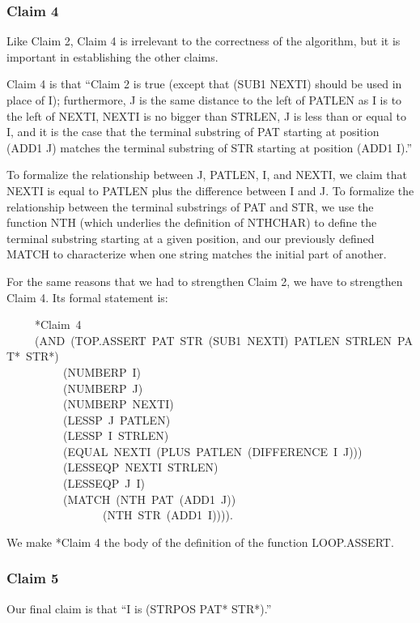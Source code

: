 \documentclass[10pt]{book}
\newenvironment{pubasis}{\begin{flushleft}}{\end{flushleft}}
\begin{document}
\subsubsection{Claim 4}
Like Claim 2, Claim 4 is irrelevant to the correctness of the algorithm,
but it is important in establishing the other claims.

Claim 4 is that ``Claim 2 is true (except that (SUB1 NEXTI) should be used in place of I); furthermore, J is the same distance to
the left of PATLEN as I is to the left of NEXTI, NEXTI is no bigger
than STRLEN, J is less than or equal to I, and it is the case that
the terminal substring of PAT starting at position (ADD1 J) matches
the terminal substring of STR starting at position (ADD1 I).''

To formalize the relationship between J, PATLEN, I, and NEXTI, we 
claim that NEXTI is equal to PATLEN plus the difference between
I and J.  To formalize the relationship between the terminal substrings
of PAT and STR, we  use the function NTH (which underlies the definition of NTHCHAR) to define the terminal
substring starting at a given position, and our previously defined MATCH
to characterize when one string matches the initial part of
another.

For the same reasons that we had to strengthen Claim 2, we have to
strengthen Claim 4.  Its formal statement is:
\begin{pubasis}
~~~~~*Claim~4\\
~~~~~(AND~(TOP.ASSERT~PAT~STR~(SUB1~NEXTI)~PATLEN~STRLEN~PAT*~STR*)\\
~~~~~~~~~~(NUMBERP~I)\\
~~~~~~~~~~(NUMBERP~J)\\
~~~~~~~~~~(NUMBERP~NEXTI)\\
~~~~~~~~~~(LESSP~J~PATLEN)\\
~~~~~~~~~~(LESSP~I~STRLEN)\\
~~~~~~~~~~(EQUAL~NEXTI~(PLUS~PATLEN~(DIFFERENCE~I~J)))\\
~~~~~~~~~~(LESSEQP~NEXTI~STRLEN)\\
~~~~~~~~~~(LESSEQP~J~I)\\
~~~~~~~~~~(MATCH~(NTH~PAT~(ADD1~J))\\
~~~~~~~~~~~~~~~~~(NTH~STR~(ADD1~I)))).\\
\end{pubasis}
We  make *Claim 4 the body of the definition of the function LOOP.ASSERT.

\subsubsection{Claim 5}
Our final claim is that ``I is (STRPOS PAT* STR*).''
\end{document}
